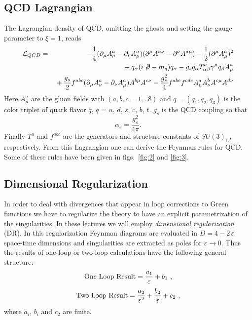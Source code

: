 \documentclass[12pt]{article}
\def\as{\alpha_s}
\newcommand{\be}{\begin{equation}}
\newcommand{\ee}{\end{equation}}
\begin{document}
\begin{itemize}
\subsection{QCD Lagrangian}
The Lagrangian density of QCD, omitting the ghosts and setting the
gauge parameter to $\xi=1$,  reads
\begin{eqnarray}\label{lqcd}
{\cal L}_{QCD} & = &
-{1\over 4}(\partial_\mu A^a_\nu-\partial_\nu A^a_\mu)
(\partial^\mu A^{a\nu}-\partial^\nu A^{a\mu})-{1\over{2}}
(\partial^\mu A^a_\mu)^2   \nonumber \\
&&{}+ \bar q_\alpha (i\not\!\partial-m_q)q_\alpha 
- g_s \bar q_\alpha T^a_{\alpha\beta}\gamma^\mu q_\beta 
A^a_\mu \nonumber \\
&&{}+{g_s\over 2}f^{abc}(\partial_\mu A^a_\nu-\partial_\nu A^a_\mu)
 A^{b\mu}A^{c\nu} - {g_s^2\over 4}f^{abe}f^{cde}A^a_\mu A^b_\nu
 A^{c\mu}A^{d\nu} 
\end{eqnarray}
Here  $A^a_\mu$ are the gluon fields with $(a,b,c=1,..8)$
 and
 $q=(q_1, q_2, q_3)$ is the color triplet of quark flavor $q$,
$q$ = $u$, $d$, $s$, $c$, $b$, $t$. 
$g_s$ is the QCD coupling so that
\be
\as=\frac{g^2_s}{4\pi}.
\ee
Finally $T^a$ and $f^{abc}$ are the generators and
structure constants of $SU(3)_C$, respectively. From this Lagrangian
one can derive the Feynman rules for QCD. Some of these rules have
been given in figs.\ \ref{fig:2} and \ref{fig:3}. 

\subsection{Dimensional Regularization}
In order to deal with divergences that appear in loop
corrections to Green functions we have to regularize the theory
to have an explicit parametrization
of the singularities. In these lectures we will employ
{\it dimensional regularization} (DR). In this regularization
 Feynman diagrams are
evaluated in $D=4-2\,\varepsilon$ space-time dimensions and singularities
are extracted as poles for $\varepsilon \to 0$. Thus the results of
 one-loop or two-loop calculations have the following general structure:
\begin{equation}
{\rm One~ Loop~ Result} = \frac{a_1}{\varepsilon}+b_1~,
\end{equation}
\begin{equation}
{\rm Two~ Loop~ Result} = \frac{a_2}{\varepsilon^2}+
 \frac{b_2}{\varepsilon}+c_2~,
\end{equation}
where $a_i$, $b_i$ and $c_2$ are finite.


\end{itemize}
\end{document}
